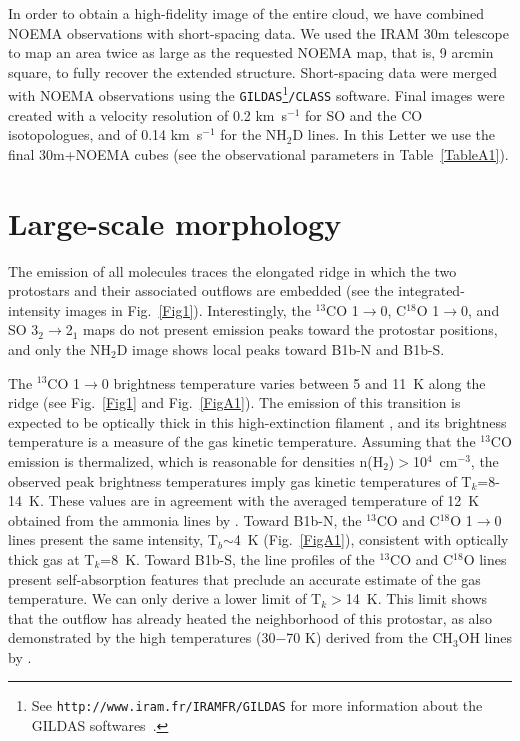 \documentclass[letter]{aa}
\begin{document}
In order to obtain a high-fidelity image of the entire cloud, we have combined NOEMA observations with short-spacing data. We used the IRAM 30m telescope to map an area twice as large as the requested
NOEMA map, that is, 9 arcmin square, to fully recover the extended structure. 
Short-spacing data were merged with NOEMA observations using the 
\texttt{GILDAS}\footnote{See \texttt{http://www.iram.fr/IRAMFR/GILDAS} 
for  more information about the GILDAS  softwares~\citep{pety05}.}\texttt{/CLASS} software. 
Final images were created  with a velocity resolution of 0.2 km~s$^{-1}$ for SO and the CO 
isotopologues, and of 0.14 km~s$^{-1}$ for the NH$_2$D lines.
In this Letter we use the final 30m+NOEMA cubes (see the observational parameters in Table~\ref{TableA1}).
%


\section{Large-scale morphology}
The emission of all molecules traces the elongated ridge in which the two protostars and their 
associated outflows are embedded (see the integrated-intensity images in Fig.~\ref{Fig1}). Interestingly, 
the $^{13}$CO 1$\rightarrow$0, C$^{18}$O 1$\rightarrow$0, and  SO 3$_2$$\rightarrow$2$_1$ maps do not 
present emission peaks toward the protostar positions, and only the NH$_2$D image shows local 
peaks toward B1b-N and B1b-S.

The $^{13}$CO 1$\rightarrow$0 brightness temperature
varies between 5 and 11~K along the ridge (see Fig.~\ref{Fig1} and Fig.~\ref{FigA1}). The emission of this transition
is expected to be optically thick in this high-extinction filament \citep{Fuente16}, and its brightness 
temperature is a measure of the gas
kinetic temperature. Assuming that the $^{13}$CO emission is thermalized, which is reasonable for 
densities n(H$_2$)$>$10$^{4}$~cm$^{-3}$, the observed peak brightness temperatures imply gas kinetic
temperatures of T$_k$=8-14~K. These values are in agreement with the averaged temperature of 12~K
obtained from the ammonia lines by \citet{Lis10}. Toward B1b-N, the $^{13}$CO 
and C$^{18}$O 1$\rightarrow$0 lines
present the same intensity, T$_b$$\sim$4~K (Fig.~\ref{FigA1}), consistent with  optically thick gas at T$_k$=8~K.
Toward B1b-S, the line profiles of the $^{13}$CO and C$^{18}$O lines present self-absorption features that
preclude an accurate estimate of the gas temperature. We can only derive a lower limit of T$_k$$>$14~K. 
This limit shows 
that the outflow has already heated the neighborhood of this protostar,
as also demonstrated by 
the high temperatures (30$-$70 K) derived from the CH$_3$OH lines by \citet{Gerin15}.
\end{document}
